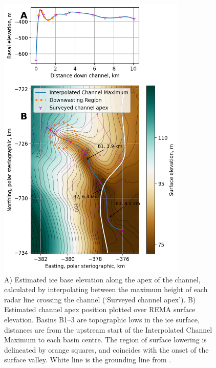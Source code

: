 \begin{figure}[!ht]
\centering
\includegraphics[width=0.8\textwidth]{chapters/2/thickness_surfacecolour.png}
\caption[Ice base profile]{A) Estimated ice base elevation along the apex of the channel, calculated by interpolating between the maximum height of each radar line crossing the channel (`Surveyed channel apex'). B) Estimated channel apex position plotted over REMA surface elevation. Basins B1--3 are topographic lows in the ice surface, distances are from the upstream start of the Interpolated Channel Maximum to each basin centre. The region of surface lowering is delineated by orange squares, and coincides with the onset of the surface valley. White line is the grounding line from \cite{depoorter2013amii}.}
\label{fig:thickness_surfacecolour}
\end{figure}  

